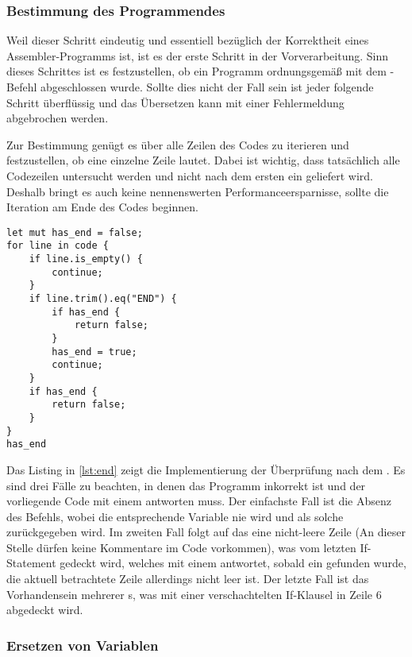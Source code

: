 \subsubsection{Bestimmung des Programmendes}

Weil dieser Schritt eindeutig und essentiell bezüglich der Korrektheit eines Assembler-Programms ist, ist es der erste Schritt in der Vorverarbeitung. Sinn dieses Schrittes ist es festzustellen, ob ein Programm ordnungsgemäß mit dem -Befehl abgeschlossen wurde. Sollte dies nicht der Fall sein ist jeder folgende Schritt überflüssig und das Übersetzen kann mit einer Fehlermeldung abgebrochen werden.

Zur Bestimmung genügt es über alle Zeilen des Codes zu iterieren und festzustellen, ob eine einzelne Zeile  lautet. Dabei ist wichtig, dass tatsächlich alle Codezeilen untersucht werden und nicht nach dem ersten  ein  geliefert wird. Deshalb bringt es auch keine nennenswerten Performanceersparnisse, sollte die Iteration am Ende des Codes beginnen. 

\begin{listing}
\begin{verbatim}
let mut has_end = false;
for line in code {
	if line.is_empty() {
		continue;
	}
	if line.trim().eq("END") {
		if has_end {
			return false;
		}
		has_end = true;
		continue;
	}
	if has_end {
		return false;
	}
}
has_end
\end{verbatim}
\label{lst:end}
\end{listing}

Das Listing in \ref{lst:end} zeigt die Implementierung der Überprüfung nach dem . Es sind drei Fälle zu beachten, in denen das Programm inkorrekt ist und der vorliegende Code mit einem  antworten muss. Der einfachste Fall ist die Absenz des Befehls, wobei die entsprechende Variable nie  wird und als solche zurückgegeben wird. Im zweiten Fall folgt auf das  eine nicht-leere Zeile (An dieser Stelle dürfen keine Kommentare im Code vorkommen), was vom letzten If-Statement gedeckt wird, welches mit einem  antwortet, sobald ein  gefunden wurde, die aktuell betrachtete Zeile allerdings nicht leer ist. Der letzte Fall ist das Vorhandensein mehrerer s, was mit einer verschachtelten If-Klausel in Zeile 6 abgedeckt wird.

\subsubsection{Ersetzen von Variablen}


